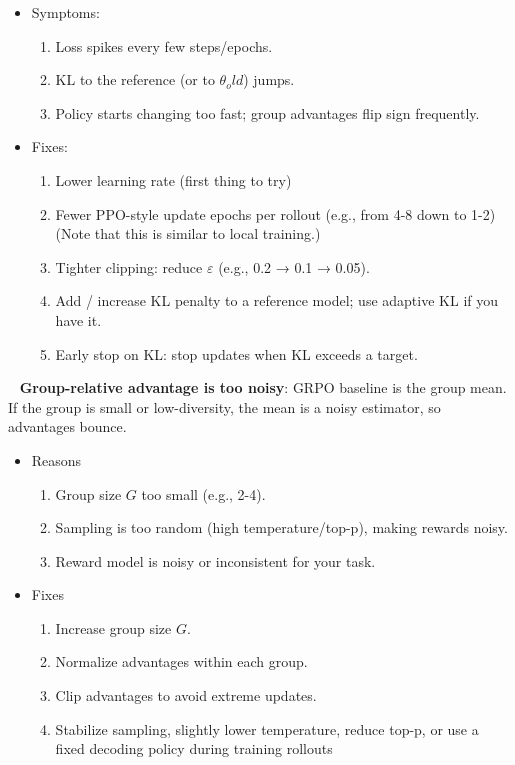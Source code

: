 \documentclass[11pt]{article}  %
\begin{document}
\begin{itemize}
  \item Symptoms: 
  \begin{enumerate}
    \item Loss spikes every few steps/epochs.
    \item KL to the reference (or to $\theta_old$) jumps.
    \item Policy starts changing too fast; group advantages flip sign frequently.
  \end{enumerate}

  \item Fixes:
  \begin{enumerate}
    \item Lower learning rate (first thing to try)
    \item Fewer PPO-style update epochs per rollout (e.g., from 4-8 down to 1-2) (Note that this is similar to local training.)
    \item Tighter clipping: reduce $\varepsilon$ (e.g., 0.2 → 0.1 → 0.05).
    \item Add / increase KL penalty to a reference model; use adaptive KL if you have it.
    \item Early stop on KL: stop updates when KL exceeds a target.
  \end{enumerate}
\end{itemize}

\textbullet~ \textbf{Group-relative advantage is too noisy}:
GRPO baseline is the group mean. If the group is small or low-diversity, the mean is a noisy estimator, so advantages bounce.

\begin{itemize}
  \item Reasons 
  \begin{enumerate}
    \item Group size $G$ too small (e.g., 2-4).
    \item Sampling is too random (high temperature/top-p), making rewards noisy.
    \item Reward model is noisy or inconsistent for your task.
  \end{enumerate}

  \item Fixes 
  \begin{enumerate}
    \item Increase group size $G$.
    \item Normalize advantages within each group.
    \item Clip advantages to avoid extreme updates.
    \item Stabilize sampling, slightly lower temperature, reduce top-p, or use a fixed decoding policy during training rollouts
  \end{enumerate}
\end{itemize}
\end{document}
